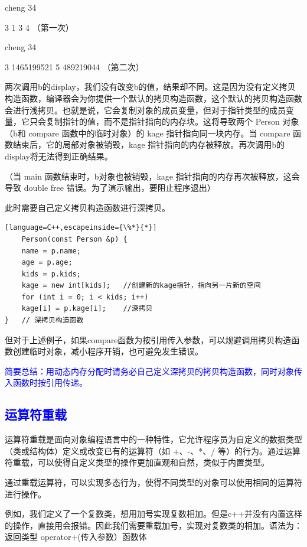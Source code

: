 \documentclass[UTF8]{ctexart}
\begin{document}
cheng 34

3 1 3 4 （第一次）

cheng 34

3 1465199521 5 489219044  （第二次）

两次调用b的display，我们没有改变b的值，结果却不同。这是因为没有定义拷贝构造函数，编译器会为你提供一个默认的拷贝构造函数，这个默认的拷贝构造函数会进行浅拷贝。也就是说，它会复制对象的成员变量，但对于指针类型的成员变量，它只会复制指针的值，而不是指针指向的内存块。这将导致两个 Person 对象（b和 compare 函数中的临时对象）的 kage 指针指向同一块内存。当 compare 函数结束后，它的局部对象被销毁，kage 指针指向的内存被释放。再次调用b的display将无法得到正确结果。

（当 main 函数结束时，b对象也被销毁，kage 指针指向的内存再次被释放，这会导致 double free 错误。为了演示输出，要阻止程序退出）

此时需要自己定义拷贝构造函数进行深拷贝。
\begin{lstlisting}[language=C++,escapeinside={\%*}{*}]
    Person(const Person &p) {
	name = p.name;
	age = p.age;
	kids = p.kids;
	kage = new int[kids];   //创建新的kage指针，指向另一片新的空间
	for (int i = 0; i < kids; i++)
	kage[i] = p.kage[i];    //深拷贝
}   // 深拷贝构造函数
\end{lstlisting}
但对于上述例子，如果compare函数为按引用传入参数，可以规避调用拷贝构造函数创建临时对象，减小程序开销，也可避免发生错误。

\textcolor{blue}{简要总结：用动态内存分配时请务必自己定义深拷贝的拷贝构造函数，同时对象传入函数时按引用传递。}
\subsection{\textcolor{blue}{运算符重载}}
运算符重载是面向对象编程语言中的一种特性，它允许程序员为自定义的数据类型（类或结构体）定义或改变已有的运算符（如 +、-、*、/ 等）的行为。通过运算符重载，可以使得自定义类型的操作更加直观和自然，类似于内置类型。

通过重载运算符，可以实现多态行为，使得不同类型的对象可以使用相同的运算符进行操作。

例如，我们定义了一个复数类，想用加号实现复数相加。但是c++并没有内置这样的操作，直接用会报错。因此我们需要重载加号，实现对复数类的相加。语法为：
返回类型  operator+(传入参数）{函数体}
\end{document}
